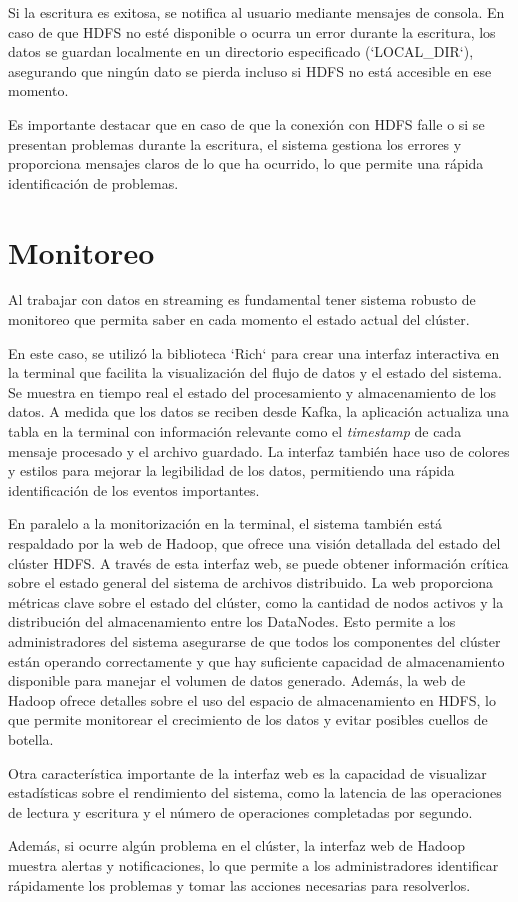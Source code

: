 \documentclass{article}
\begin{document}
Si la escritura es exitosa, se notifica al usuario mediante mensajes de consola. En caso de que HDFS no esté disponible o ocurra un error durante la escritura, los datos se guardan localmente en un directorio especificado (`LOCAL\_DIR`), asegurando que ningún dato se pierda incluso si HDFS no está accesible en ese momento.

Es importante destacar que en caso de que la conexión con HDFS falle o si se presentan problemas durante la escritura, el sistema gestiona los errores y proporciona mensajes claros de lo que ha ocurrido, lo que permite una rápida identificación de problemas.

\section{Monitoreo}

Al trabajar con datos en streaming es fundamental tener sistema robusto de monitoreo que permita saber en cada momento el estado actual del clúster.

En este caso, se utilizó la biblioteca `Rich` para crear una interfaz interactiva en la terminal que facilita la visualización del flujo de datos y el estado del sistema.
Se muestra en tiempo real el estado del procesamiento y almacenamiento de los datos. A medida que los datos se reciben desde Kafka, la aplicación actualiza una tabla en la terminal con información relevante como el \textit{timestamp} de cada mensaje procesado y el archivo guardado. La interfaz también hace uso de colores y estilos para mejorar la legibilidad de los datos, permitiendo una rápida identificación de los eventos importantes.

En paralelo a la monitorización en la terminal, el sistema también está respaldado por la web de Hadoop, que ofrece una visión detallada del estado del clúster HDFS. A través de esta interfaz web, se puede obtener información crítica sobre el estado general del sistema de archivos distribuido. La web proporciona métricas clave sobre el estado del clúster, como la cantidad de nodos activos y la distribución del almacenamiento entre los DataNodes. Esto permite a los administradores del sistema asegurarse de que todos los componentes del clúster están operando correctamente y que hay suficiente capacidad de almacenamiento disponible para manejar el volumen de datos generado.
Además, la web de Hadoop ofrece detalles sobre el uso del espacio de almacenamiento en HDFS, lo que permite monitorear el crecimiento de los datos y evitar posibles cuellos de botella.

Otra característica importante de la interfaz web es la capacidad de visualizar estadísticas sobre el rendimiento del sistema, como la latencia de las operaciones de lectura y escritura y el número de operaciones completadas por segundo.

Además, si ocurre algún problema en el clúster, la interfaz web de Hadoop muestra alertas y notificaciones, lo que permite a los administradores identificar rápidamente los problemas y tomar las acciones necesarias para resolverlos.
\end{document}
